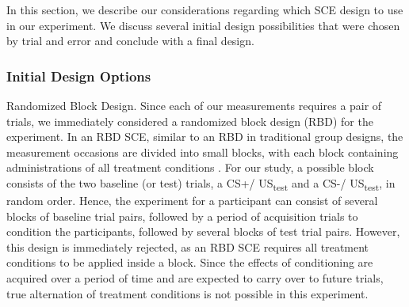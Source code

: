 \documentclass{article}
\begin{document}
In this section, we describe our considerations regarding which SCE design to use in our experiment. We discuss several initial design possibilities that were chosen by trial and error and conclude with a final design.

\subsubsection{Initial Design Options} 

Randomized Block Design. Since each of our measurements requires a pair of trials, we immediately considered a randomized block design (RBD) for the experiment. In an RBD SCE, similar to an RBD in traditional group designs, the measurement occasions are divided into small blocks, with each block containing administrations of all treatment conditions \autocite{bib45}. For our study, a possible block consists of the two baseline (or test) trials, a CS+/ US\textsubscript{test} and a CS-/ US\textsubscript{test}, in random order. Hence, the experiment for a participant can consist of several blocks of baseline trial pairs, followed by a period of acquisition trials to condition the participants, followed by several blocks of test trial pairs. However, this design is immediately rejected, as an RBD SCE requires all treatment conditions to be applied inside a block. Since the effects of conditioning are acquired over a period of time and are expected to carry over to future trials, true alternation of treatment conditions is not possible in this experiment. 
\end{document}
